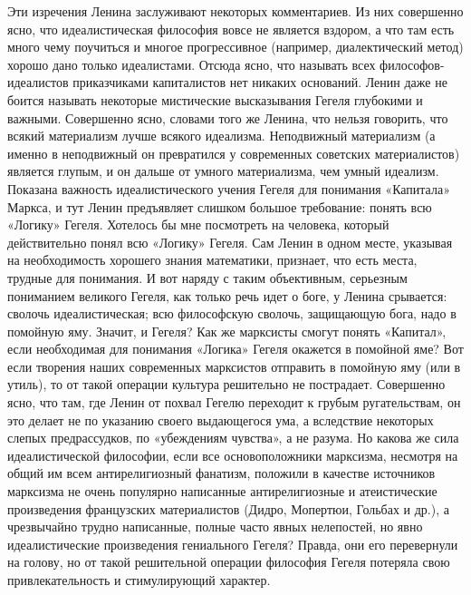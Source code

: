 Эти  изречения  Ленина  заслуживают  некоторых  комментариев.  Из  них
совершенно  ясно,  что  идеалистическая философия  вовсе  не  является
вздором, а  что там есть  много чему поучиться и  многое прогрессивное
(например,  диалектический  метод)  хорошо  дано  только  идеалистами.
Отсюда  ясно,  что  называть  всех  философов-идеалистов  приказчиками
капиталистов  нет никаких  оснований.  Ленин даже  не боится  называть
некоторые  мистические   высказывания  Гегеля  глубокими   и  важными.
Совершенно  ясно, словами  того же  Ленина, что  нельзя говорить,  что
всякий  материализм лучше  всякого идеализма.  Неподвижный материализм
(а  именно  в  неподвижный  он  превратился  у  современных  советских
материалистов) является  глупым, и  он дальше от  умного материализма,
чем умный  идеализм. Показана важность идеалистического  учения Гегеля
для  понимания  «Капитала» Маркса,  и  тут  Ленин предъявляет  слишком
большое  требование:  понять  всю  «Логику» Гегеля.  Хотелось  бы  мне
посмотреть  на  человека,  который действительно  понял  всю  «Логику»
Гегеля. Сам  Ленин в одном  месте, указывая на  необходимость хорошего
знания математики,  признает, что  есть места, трудные  для понимания.
И  вот  наряду  с  таким объективным,  серьезным  пониманием  великого
Гегеля,  как только  речь идет  о  боге, у  Ленина срывается:  сволочь
идеалистическая;  всю философскую  сволочь,  защищающую  бога, надо  в
помойную  яму.  Значит,  и  Гегеля? Как  же  марксисты  смогут  понять
«Капитал»,  если необходимая  для понимания  «Логика» Гегеля  окажется
в  помойной  яме?  Вот  если  творения  наших  современных  марксистов
отправить  в  помойную  яму  (или  в  утиль),  то  от  такой  операции
культура  решительно  не пострадает.  Совершенно  ясно,  что там,  где
Ленин  от  похвал Гегелю  переходит  к  грубым ругательствам,  он  это
делает не по  указанию своего выдающегося ума,  а вследствие некоторых
слепых  предрассудков,  по  «убеждениям  чувства»,  а  не  разума.  Но
какова  же сила  идеалистической философии,  если все  основоположники
марксизма,  несмотря  на  общий   им  всем  антирелигиозный  фанатизм,
положили в качестве источников марксизма не очень популярно написанные
антирелигиозные и атеистические произведения французских материалистов
(Дидро,  Мопертюи, Гольбах  и др.),  а чрезвычайно  трудно написанные,
полные часто  явных нелепостей,  но явно  идеалистические произведения
гениального Гегеля? Правда, они его перевернули на голову, но от такой
решительной операции философия  Гегеля потеряла свою привлекательность
и стимулирующий характер.

